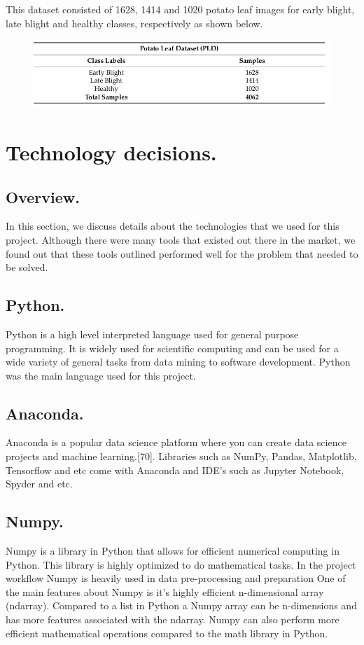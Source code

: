 \documentclass[11pt]{report}
\begin{document}
This dataset consisted of 1628, 1414 and 1020 potato
leaf images for early blight, late blight and healthy classes, respectively as shown below.\\

\begin{figure}[h]
	\centerline{\small 
		\includegraphics[height=0.11\textheight]  {hjk}}
\end{figure}

\section{Technology decisions.}
\subsection{Overview.}
In this section, we discuss details about the technologies that we used for this project. Although there were many
tools that existed out there in the market, we found out that these tools outlined performed well for the
problem that needed to be solved.\\

\subsection{Python.}
Python is a high level interpreted language used for general purpose programming. It is widely used for
scientific computing and can be used for a wide variety of general tasks from data mining to software
development. Python was the main language used for this project.\\

\subsection{Anaconda.}
Anaconda is a popular data science platform where you can create data science projects and machine
learning.[70]. Libraries such as NumPy, Pandas, Matplotlib, Tensorflow and etc come with Anaconda and
IDE’s such as Jupyter Notebook, Spyder and etc.\\

\subsection{Numpy.}
Numpy is a library in Python that allows for efficient numerical computing in Python. This library is highly
optimized to do mathematical tasks. In the project workflow Numpy is heavily used in data pre-processing
and preparation One of the main features about Numpy is it’s highly efficient n-dimensional array (ndarray).
Compared to a list in Python a Numpy array can be n-dimensions and has more features associated with the
ndarray. Numpy can also perform more efficient mathematical operations compared to the math library in
Python.\\
\end{document}
